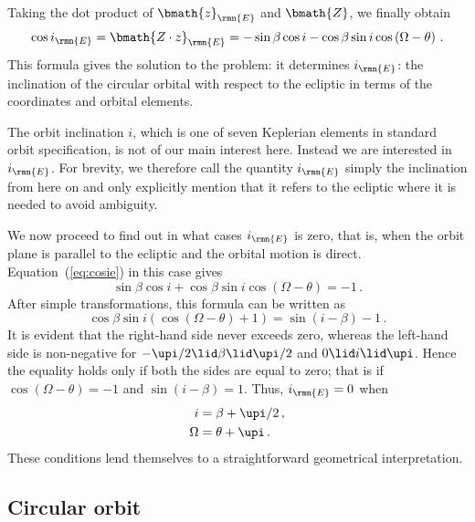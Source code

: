 \documentclass[fleqn,usenatbib,useAMS,usedcolumn]{mnras}
\begin{document}
Taking the dot product of $\bmath{z}_\rmn{E}$ and $\bmath{Z}$, we finally obtain
\begin{equation}\label{eq:cosie}
 \cos i_\rmn{E}=\bmath{Z\cdot z}_\rmn{E}=
 -\sin\beta\cos i-\cos\beta\sin i\cos\left(\Omega-\theta\right)\,.
\end{equation}
This formula gives the solution to the problem: it determines $i_\rmn{E}$: the inclination of the circular orbital with respect to the ecliptic in terms of the coordinates and orbital elements.

The orbit inclination $i$, which is one of seven Keplerian elements in standard orbit specification, is not of our main interest here. Instead we are interested in $i_\rmn{E}$. For brevity, we therefore call the quantity $i_\rmn{E}$ simply the inclination from here on and only explicitly mention that it refers to the ecliptic where it is needed to avoid ambiguity.

We now proceed to find out in what cases $i_\rmn{E}$ is zero, that is, when the orbit plane is parallel to the ecliptic and the orbital motion is direct. Equation~(\ref{eq:cosie}) in this case gives
\begin{equation}\label{eq:cosie0}
  \sin\beta\cos i+\cos\beta\sin i\cos\left(\Omega-\theta\right)=-1\,.
\end{equation}
After simple transformations, this formula can be written as
\begin{equation}
  \cos\beta\sin i\left(\cos\left(\Omega-\theta\right)+1\right)=\sin\left(i-\beta\right)-1\,.
\end{equation}
It is evident that the right-hand side never exceeds zero, whereas the left-hand side is non-negative for $-\upi/2\lid\beta\lid\upi/2$ and $0\lid i\lid\upi$. Hence the equality holds only if both the sides are equal to zero; that is if $\cos\left(\Omega-\theta\right)=-1$ and $\sin\left(i-\beta\right)=1$. Thus, $i_\rmn{E}=0$ when
\begin{align}\label{eq:condition-i-beta}
  i&=\beta+\upi/2\,,\\
     \label{eq:condition-Omega-theta}
  \Omega&=\theta+\upi\,.
\end{align}
These conditions lend themselves to a straightforward geometrical interpretation.

\subsection{Circular orbit}\label{ss:correlation}
\end{document}
